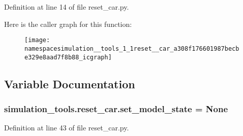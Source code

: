 Definition at line 14 of file reset\+\_\+car.\+py.



Here is the caller graph for this function\+:
\nopagebreak
\begin{figure}[H]
\begin{center}
\leavevmode
\texttt{[image: namespacesimulation\_\_tools\_1\_1reset\_\_car\_a308f176601987becbe329e8aad7f8b88\_icgraph]}
\end{center}
\end{figure}




\subsection{Variable Documentation}
\subsubsection[{\texorpdfstring{set\+\_\+model\+\_\+state}{set_model_state}}]{\setlength{\rightskip}{0pt plus 5cm}simulation\+\_\+tools.\+reset\+\_\+car.\+set\+\_\+model\+\_\+state = None}\hypertarget{namespacesimulation__tools_1_1reset__car_a0fcc6f9aa08bea780ef83201d5a71169}{}\label{namespacesimulation__tools_1_1reset__car_a0fcc6f9aa08bea780ef83201d5a71169}


Definition at line 43 of file reset\+\_\+car.\+py.

